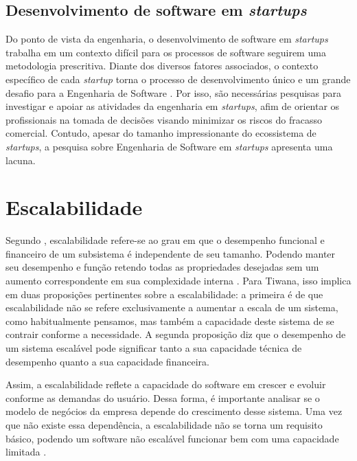 \subsection{Desenvolvimento de software em \textit{startups}}

Do ponto de vista da engenharia, o desenvolvimento de software em \textit{startups}
trabalha em um contexto difícil para os processos de software seguirem uma metodologia
prescritiva. Diante dos diversos fatores associados, o contexto específico de cada
\textit{startup} torna o processo de desenvolvimento único e um grande desafio para
a Engenharia de Software \cite{Giardino2016}. Por isso, são necessárias pesquisas para
investigar e apoiar as atividades da engenharia em \textit{startups}, afim de orientar
os profissionais na tomada de decisões visando minimizar os riscos do fracasso
comercial. Contudo, apesar do tamanho impressionante do ecossistema de
\textit{startups}, a pesquisa sobre Engenharia de Software em \textit{startups}
apresenta uma lacuna\cite{Giardino2016}.

\section{Escalabilidade}

Segundo , escalabilidade refere-se ao grau em que
o desempenho funcional e financeiro de um subsistema é independente de seu tamanho.
Podendo manter seu desempenho e função retendo todas as propriedades desejadas sem
um aumento correspondente em sua complexidade interna
. Para Tiwana, isso implica em duas
proposições pertinentes sobre a escalabilidade: a primeira é de que escalabilidade não
se refere exclusivamente a aumentar a escala de um sistema, como habitualmente
pensamos, mas também a capacidade deste sistema de se contrair conforme a necessidade.
A segunda proposição diz que o desempenho de um sistema escalável pode significar
tanto a sua capacidade técnica de desempenho quanto a sua capacidade financeira.

Assim, a escalabilidade reflete a capacidade do software em crescer e evoluir
conforme as demandas do usuário. Dessa forma, é importante analisar se o
modelo de negócios da empresa depende do crescimento desse sistema. Uma vez que
não existe essa dependência, a escalabilidade não se torna um requisito básico,
podendo um software não escalável funcionar bem com uma capacidade limitada
\cite{ConceptaScalability}.

